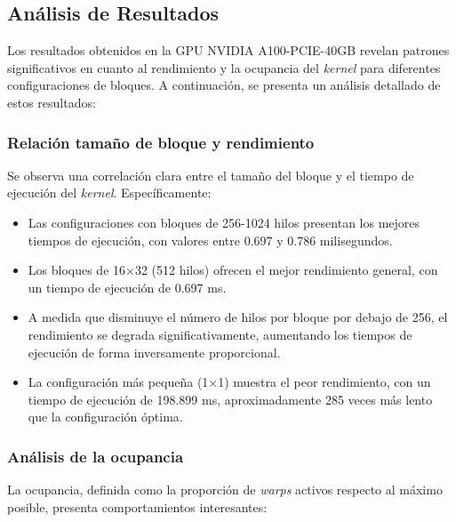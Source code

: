     \subsection{Análisis de Resultados}
    
        Los resultados obtenidos en la GPU NVIDIA A100-PCIE-40GB revelan patrones significativos en cuanto al rendimiento y la ocupancia del \textit{kernel} para diferentes configuraciones de bloques. A continuación, se presenta un análisis detallado de estos resultados:

        \subsubsection{Relación tamaño de bloque y rendimiento}
    
            Se observa una correlación clara entre el tamaño del bloque y el tiempo de ejecución del \textit{kernel}. Específicamente:
        
            \begin{itemize}
              
                \item Las configuraciones con bloques de 256-1024 hilos presentan los mejores tiempos de ejecución, con valores entre 0.697 y 0.786 milisegundos.
                
                \item Los bloques de 16×32 (512 hilos) ofrecen el mejor rendimiento general, con un tiempo de ejecución de 0.697 ms.
                
                \item A medida que disminuye el número de hilos por bloque por debajo de 256, el rendimiento se degrada significativamente, aumentando los tiempos de ejecución de forma inversamente proporcional.
                
                \item La configuración más pequeña (1×1) muestra el peor rendimiento, con un tiempo de ejecución de 198.899 ms, aproximadamente 285 veces más lento que la configuración óptima.
            
            \end{itemize}

        \subsubsection{Análisis de la ocupancia}

            La ocupancia, definida como la proporción de \textit{warps} activos respecto al máximo posible, presenta comportamientos interesantes:
            
